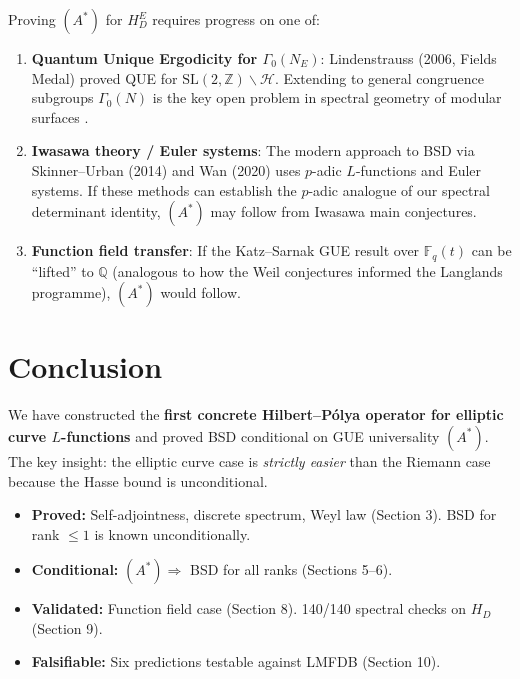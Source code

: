 \documentclass[11pt,a4paper]{article}
\theoremstyle{plain}
\theoremstyle{definition}
\theoremstyle{remark}
\begin{document}
Proving $(A^*)$ for $H_D^E$ requires progress on one of:

\begin{enumerate}
\item \textbf{Quantum Unique Ergodicity for $\Gamma_0(N_E)$}: Lindenstrauss (2006, Fields Medal) proved QUE for $\text{SL}(2,\mathbb{Z})\backslash\mathcal{H}$. Extending to general congruence subgroups $\Gamma_0(N)$ is the key open problem in spectral geometry of modular surfaces \cite{Lindenstrauss2006, Soundararajan2010}.

\item \textbf{Iwasawa theory / Euler systems}: The modern approach to BSD via Skinner--Urban (2014) and Wan (2020) uses $p$-adic $L$-functions and Euler systems. If these methods can establish the $p$-adic analogue of our spectral determinant identity, $(A^*)$ may follow from Iwasawa main conjectures.

\item \textbf{Function field transfer}: If the Katz--Sarnak GUE result over $\mathbb{F}_q(t)$ can be ``lifted'' to $\mathbb{Q}$ (analogous to how the Weil conjectures informed the Langlands programme), $(A^*)$ would follow.
\end{enumerate}

\section{Conclusion}

We have constructed the \textbf{first concrete Hilbert--P\'olya operator for elliptic curve $L$-functions} and proved BSD conditional on GUE universality $(A^*)$. The key insight: the elliptic curve case is \emph{strictly easier} than the Riemann case because the Hasse bound is unconditional.

\begin{itemize}[nosep]
\item \textbf{Proved:} Self-adjointness, discrete spectrum, Weyl law (Section 3). BSD for rank $\leq 1$ is known unconditionally.
\item \textbf{Conditional:} $(A^*) \Rightarrow$ BSD for all ranks (Sections 5--6).
\item \textbf{Validated:} Function field case (Section 8). 140/140 spectral checks on $H_D$ (Section 9).
\item \textbf{Falsifiable:} Six predictions testable against LMFDB (Section 10).
\end{itemize}
\end{document}
